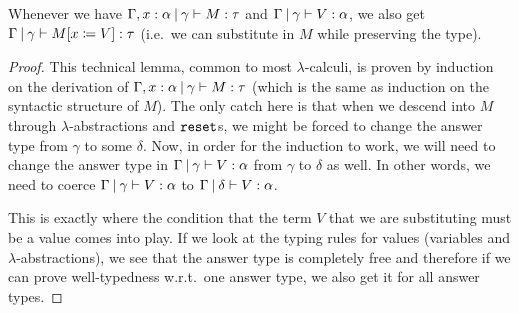 \begin{lemma}
  \label{lem:subst-shift}

  Whenever we have $\Gamma, x : \alpha \mathbin{|} \gamma \vdash M : \tau$ and
  $\Gamma \mathbin{|} \gamma \vdash V : \alpha$, we also get $\Gamma \mathbin{|} \gamma
  \vdash M[x \coloneqq V] : \tau$ (i.e.\ we can substitute in $M$ while
  preserving the type).
\end{lemma}
\begin{proof}
  This technical lemma, common to most $\lambda$-calculi, is proven by
  induction on the derivation of
  $\Gamma, x : \alpha \mathbin{|} \gamma \vdash M : \tau$ (which is the same as
  induction on the syntactic structure of $M$). The only catch here is that
  when we descend into $M$ through $\lambda$-abstractions and $\mathtt{reset}$s, we
  might be forced to change the answer type from $\gamma$ to some
  $\delta$. Now, in order for the induction to work, we will need to change
  the answer type in $\Gamma \mathbin{|} \gamma \vdash V : \alpha$ from $\gamma$
  to $\delta$ as well. In other words, we need to coerce
  $\Gamma \mathbin{|} \gamma \vdash V : \alpha$ to
  $\Gamma \mathbin{|} \delta \vdash V : \alpha$.

  This is exactly where the condition that the term $V$ that we are
  substituting must be a value comes into play. If we look at the typing
  rules for values (variables and $\lambda$-abstractions), we see that the
  answer type is completely free and therefore if we can prove
  well-typedness w.r.t.\ one answer type, we also get it for all answer
  types.
\end{proof}

